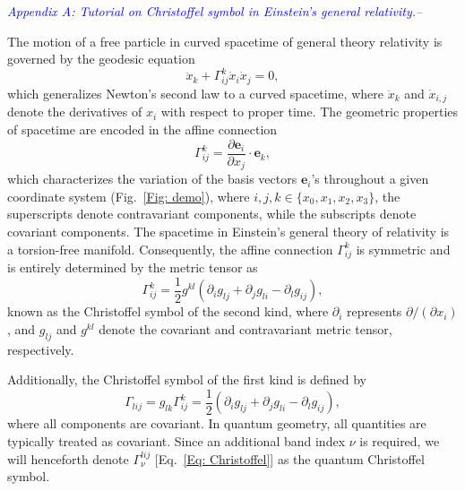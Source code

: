 \documentclass[aps,prl,twocolumn,amsmath,amssymb,showpacs, superscriptaddress,notitlepage,longbibliography,10pt]{revtex4-1}
\begin{document}
\hypertarget{Appendix A}{\textit{\textcolor{blue}{Appendix A: Tutorial on Christoffel symbol in Einstein's general relativity.}--}}
The motion of a free particle in curved spacetime of general theory relativity is governed by the geodesic equation
\begin{equation}\label{Eq: Geodesic}
\ddot{x}_k + \Gamma^k_{ij} \dot{x}_i \dot{x}_j = 0,
\end{equation}
which generalizes Newton's second law to a curved spacetime, where $\ddot{x}_k$ and $\dot{x}_{i,j}$ denote the derivatives of $x_i$ with respect to proper time. The geometric properties of spacetime are encoded in the affine connection
\begin{equation}
\Gamma_{ij}^k=\frac{\partial\boldsymbol{e}_i}{\partial x_j}\cdot\boldsymbol{e}_k,
\end{equation}
which characterizes the variation of the basis vectors $\boldsymbol{e}_i$'s throughout a given coordinate system (Fig.~\ref{Fig: demo}),
where $i,j,k\in \{x_0,x_1,x_2,x_3\}$, the superscripts denote contravariant components, while the subscripts denote covariant components. The spacetime in Einstein's general theory of relativity is a torsion-free manifold. Consequently, the affine connection $\Gamma_{ij}^k$ is symmetric and is entirely determined by the metric tensor as~\cite{KPThorne73book,Wald10book}
\begin{equation}\label{Eq: Gamma_GR}
\Gamma_{ij}^k = \frac{1}{2}g^{kl}(\partial_i g_{lj} + \partial_j g_{li} - \partial_l g_{ij}),
\end{equation}
known as the Christoffel symbol of the second kind, where $\partial_i$ represents $\partial/(\partial x_i)$, and $g_{lj}$ and $g^{kl}$ denote the covariant and contravariant metric tensor, respectively.

Additionally, the Christoffel symbol of the first kind is defined by
\begin{equation}
\Gamma_{lij}=g_{lk}\Gamma_{ij}^k=\frac{1}{2}(\partial_i g_{lj}+\partial_j g_{li}-\partial_l g_{ij}),
\end{equation}
where all components are covariant. In quantum geometry, all quantities are typically treated as covariant. Since an additional band index $\nu$ is required, we will henceforth denote $\Gamma_\nu^{lij}$ [Eq.~\eqref{Eq: Christoffel}] as the quantum Christoffel symbol.



\renewcommand{\theequation}{B\arabic{equation}}

\setcounter{equation}{0}
\end{document}

